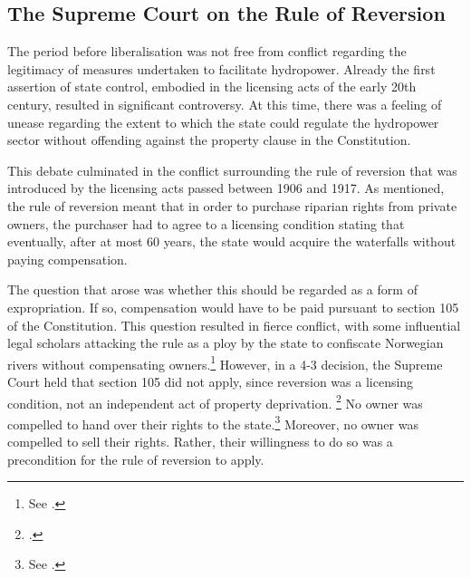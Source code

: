 
\subsection{The Supreme Court on the Rule of Reversion}\label{sec:prelib}

The period before liberalisation was not free from conflict regarding the legitimacy of measures undertaken to facilitate hydropower. Already the first assertion of state control, embodied in the licensing acts of the early 20th century, resulted in significant controversy. At this time, there was a feeling of unease regarding the extent to which the state could regulate the hydropower sector without offending against the property clause in the Constitution.

This debate culminated in the conflict surrounding the rule of reversion that was introduced by the licensing acts passed between 1906 and 1917. As mentioned, the rule of reversion meant that in order to purchase riparian rights from private owners, the purchaser had to agree to a licensing condition stating that eventually, after at most 60 years, the state would acquire the waterfalls without paying compensation.

The question that arose was whether this should be regarded as a form of expropriation. If so, compensation would have to be paid pursuant to section 105 of the Constitution. This question resulted in fierce conflict, with some influential legal scholars attacking the rule as a ploy by the state to confiscate Norwegian rivers  without compensating owners.\footnote{See \cite{morgenstierne14}.} However, in a 4-3 decision, the Supreme Court held that section 105 did not apply, since reversion was a licensing condition, not an independent act of property deprivation. \footcite{johansen18} No owner was compelled to hand over their rights to the state.\footnote{See \cite[406]{johansen15}.} Moreover, no owner was compelled to sell their rights. Rather, their willingness to do so was a precondition for the rule of reversion to apply.

